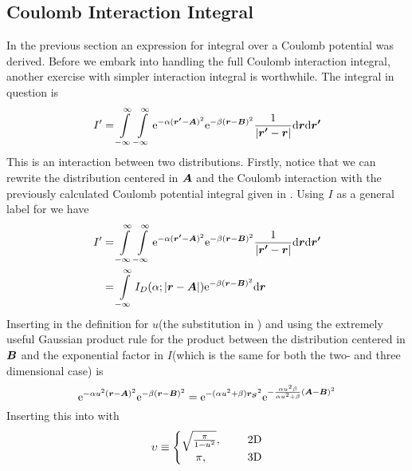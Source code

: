\subsection{Coulomb Interaction Integral}
    In the previous section an expression for integral over a Coulomb potential
    was derived. Before we embark into handling the full Coulomb interaction
    integral, another exercise with simpler interaction integral is worthwhile.
    The integral in question is
        \begin{equation}
            I' = \int\limits^{\infty}_{-\infty}\int\limits^{\infty}_{-\infty} \mathrm{e}^{-\alpha(\boldsymbol{{r'}}-\boldsymbol{{A}})^2}
            \mathrm{e}^{-\beta(\boldsymbol{{r}}-\boldsymbol{{B}})^2} \frac{1}{\abs{\boldsymbol{{r'}} -
            \boldsymbol{{r}}}} \mathrm{d}\boldsymbol{{r}} \mathrm{d}\boldsymbol{{r'}}
            \label{eq:coulombInteractionSimple}
        \end{equation}
    This is an interaction between two distributions. Firstly, notice that we
    can rewrite the distribution centered in $\boldsymbol{{A}}$ and the Coulomb
    interaction with the previously calculated Coulomb potential integral given
    in . Using $I$ as a general label for
     we have
        \begin{align}
            I' &= \int\limits^{\infty}_{-\infty}\int\limits^{\infty}_{-\infty} \mathrm{e}^{-\alpha(\boldsymbol{{r'}}-\boldsymbol{{A}})^2}
            \mathrm{e}^{-\beta(\boldsymbol{{r}}-\boldsymbol{{B}})^2} \frac{1}{\abs{\boldsymbol{{r'}} -
            \boldsymbol{{r}}}} \mathrm{d}\boldsymbol{{r}} \mathrm{d}\boldsymbol{{r'}} \nonumber \\
            &= \int\limits^{\infty}_{-\infty} I_D(\alpha;\abs{\boldsymbol{{r}}-\boldsymbol{{A}}}) \mathrm{e}^{-\beta(\boldsymbol{{r}}
            - \boldsymbol{{B}})^2} \mathrm{d}\boldsymbol{{r}}
            \label{eq:Cintr1}
        \end{align}
    Inserting in the definition for $u$(the substitution in )
    and using the extremely useful Gaussian product rule for the product
    between the distribution centered in $\boldsymbol{{B}}$ and the exponential factor
    in $I$(which is the same for both the two- and three dimensional case) is
        \begin{equation}
            \mathrm{e}^{-\alpha u^2(\boldsymbol{{r}}-\boldsymbol{{A}})^2} \mathrm{e}^{-\beta(\boldsymbol{{r}} -
            \boldsymbol{{B}})^2} = \mathrm{e}^{-(\alpha u^2 + \beta)\boldsymbol{{r_S}}^2}
            \mathrm{e}^{-\frac{\alpha u^2\beta}{\alpha u^2 + \beta}
            (\boldsymbol{{A}}-\boldsymbol{{B}})^2}
        \end{equation}
    Inserting this into  with
        \begin{equation}
            \upsilon \equiv \left\{
                \begin{matrix}
                    \sqrt{\frac{\pi}{1-u^2}},&\indent
                    \text{2D} \\
                    \pi,&\indent \text{3D}
                \end{matrix}\right.
        \end{equation}
